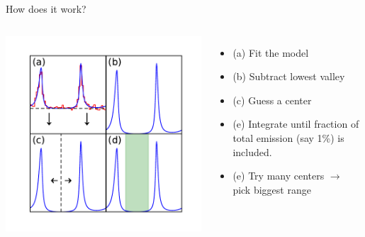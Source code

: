 \documentclass[12pt]{beamer}
\begin{document}
\begin{frame}{How does it work?}

\begin{columns}
  \includegraphics[width=1\textwidth]{plots/find_off_pulse.pdf}
  \begin{itemize}
    \item (a) Fit the model
    \item (b) Subtract lowest valley
    \item (c) Guess a center
    \item (e) Integrate until fraction of total emission (say 1\%) is included.
    \item (e) Try many centers $\rightarrow$ pick biggest range
  \end{itemize}
\end{columns}
\end{frame}
\end{document}
